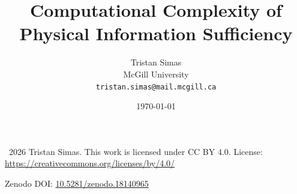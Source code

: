 \documentclass[11pt]{article}
\title{Computational Complexity of Physical Information Sufficiency}
\author{
  Tristan Simas\\
  McGill University\\
  \texttt{tristan.simas@mail.mcgill.ca}
}
\date{\today}
\begin{document}
\maketitle

\begingroup
\footnotesize
\noindent\textcopyright\ 2026 Tristan Simas.
This work is licensed under CC BY 4.0.
License: \url{https://creativecommons.org/licenses/by/4.0/}
\par
\noindent Zenodo DOI: \href{https://doi.org/10.5281/zenodo.18140965}{10.5281/zenodo.18140965}
\par
\endgroup

\begin{abstract}

\end{abstract}

















\end{document}
